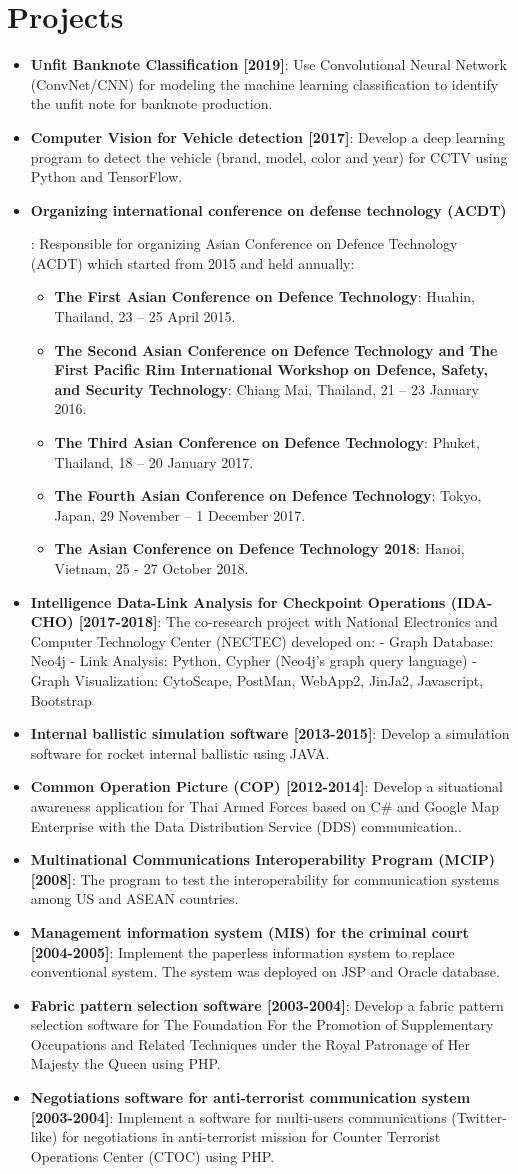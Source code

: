 \documentclass[letterpaper,11pt]{article}
\newcommand{\resumeItem}[2]{
  \item\small{
    \textbf{#1}{: #2 \vspace{-2pt}}
  }
}
\newcommand{\resumeSubItem}[2]{\resumeItem{#1}{#2}\vspace{-4pt}}
\newcommand{\resumeSubHeadingListStart}{\begin{itemize}[leftmargin=*]}
\newcommand{\resumeSubHeadingListEnd}{\end{itemize}}
\newcommand{\resumeItemListStart}{\begin{itemize}}
\newcommand{\resumeItemListEnd}{\end{itemize}\vspace{-5pt}}
\begin{document}
\section{Projects}
  \resumeSubHeadingListStart
    \resumeSubItem{Unfit Banknote Classification [2019]}
      {Use Convolutional Neural Network (ConvNet/CNN) for modeling the machine learning classification to identify the unfit note for banknote production.}
    \resumeSubItem{Computer Vision for Vehicle detection [2017]}
      {Develop a deep learning program to detect the vehicle (brand, model, color and year) for CCTV using Python and TensorFlow.}
    \resumeSubItem{Organizing international conference on defense technology (ACDT)}
      {Responsible for organizing Asian Conference on Defence Technology (ACDT) which started from 2015 and held annually:
      \resumeItemListStart
      \resumeItem{The First Asian Conference on Defence Technology}{Huahin, Thailand, 23 – 25 April 2015.}
      \resumeItem{The Second Asian Conference on Defence Technology and The First Pacific Rim International Workshop on Defence, Safety, and Security Technology}{Chiang Mai, Thailand, 21 – 23 January 2016.}
      \resumeItem{The Third Asian Conference on Defence Technology}{Phuket, Thailand, 18 – 20 January 2017.}
      \resumeItem{The Fourth Asian Conference on Defence Technology}{Tokyo, Japan, 29 November – 1 December 2017.}
      \resumeItem{The Asian Conference on Defence Technology 2018}{Hanoi, Vietnam, 25 - 27 October 2018.}
      \resumeItemListEnd
      }
      
    \resumeSubItem{Intelligence Data-Link Analysis for Checkpoint Operations (IDA-CHO) [2017-2018]}
      {The co-research project with National Electronics and Computer Technology Center (NECTEC) developed on:
      - Graph Database: Neo4j
      - Link Analysis: Python, Cypher (Neo4j's graph query language)
      - Graph Visualization: CytoScape, PostMan, WebApp2, JinJa2, Javascript, Bootstrap}
    \resumeSubItem{Internal ballistic simulation software [2013-2015]}
      {Develop a simulation software for rocket internal ballistic using JAVA.}
    \resumeSubItem{Common Operation Picture (COP) [2012-2014]}
      {Develop a situational awareness application for Thai Armed Forces based on C\# and Google Map Enterprise with the Data Distribution Service (DDS) communication..}
    \resumeSubItem{Multinational Communications Interoperability Program (MCIP) [2008]}
      {The program to test the interoperability for communication systems among US and ASEAN countries.}
    \resumeSubItem{Management information system (MIS) for the criminal court [2004-2005]}
      {Implement the paperless information system to replace conventional system. The system was deployed on JSP and Oracle database.}
    \resumeSubItem{Fabric pattern selection software [2003-2004]}
      {Develop a fabric pattern selection software for The Foundation For the Promotion of Supplementary Occupations and Related Techniques under the Royal Patronage of Her Majesty the Queen using PHP.}
    \resumeSubItem{Negotiations software for anti-terrorist communication system [2003-2004]}
      {Implement a software for multi-users communications (Twitter-like) for negotiations in anti-terrorist mission for Counter Terrorist Operations Center (CTOC) using PHP.}
  \resumeSubHeadingListEnd
\end{document}
